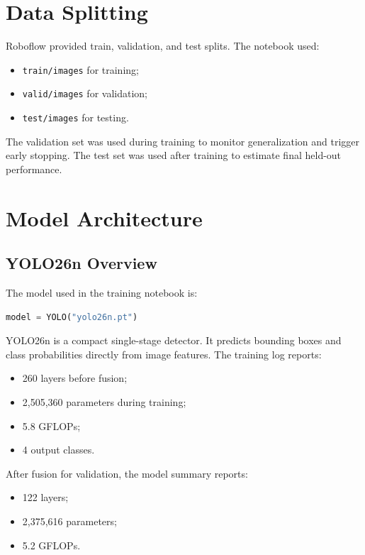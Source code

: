 \documentclass[12pt,a4paper]{article}
\begin{document}
\section{Data Splitting}

Roboflow provided train, validation, and test splits. The notebook used:
\begin{itemize}[noitemsep]
    \item \texttt{train/images} for training;
    \item \texttt{valid/images} for validation;
    \item \texttt{test/images} for testing.
\end{itemize}

The validation set was used during training to monitor generalization and trigger early stopping. The test set was used after training to estimate final held-out performance.

\section{Model Architecture}

\subsection{YOLO26n Overview}

The model used in the training notebook is:
\begin{lstlisting}[language=Python]
model = YOLO("yolo26n.pt")
\end{lstlisting}

YOLO26n is a compact single-stage detector. It predicts bounding boxes and class probabilities directly from image features. The training log reports:
\begin{itemize}[noitemsep]
    \item 260 layers before fusion;
    \item 2,505,360 parameters during training;
    \item 5.8 GFLOPs;
    \item 4 output classes.
\end{itemize}

After fusion for validation, the model summary reports:
\begin{itemize}[noitemsep]
    \item 122 layers;
    \item 2,375,616 parameters;
    \item 5.2 GFLOPs.
\end{itemize}
\end{document}
